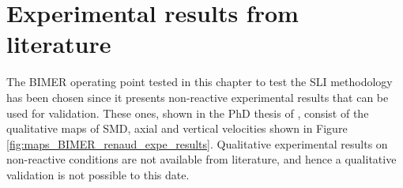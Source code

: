 




\section{Experimental results from literature}
\label{ch9:sec_expe_results_LGS_BIMER}

The BIMER operating point tested in this chapter to test the SLI methodology has been chosen since it presents non-reactive experimental results that can be used for validation. These ones, shown in the PhD thesis of , consist of the qualitative maps of SMD, axial and vertical velocities shown in Figure \ref{fig:maps_BIMER_renaud_expe_results}. Qualitative experimental results on non-reactive conditions are not available from literature, and hence a qualitative validation is not possible to this date.

